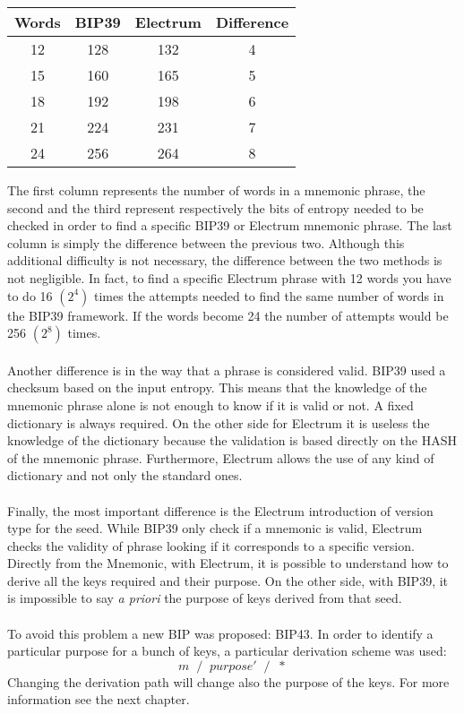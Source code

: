 \begin{center}
	\begin{tabular}{|| c | c | c | c ||} 
		\hline
		Words & BIP39 & Electrum & Difference \\ [0.5ex] 
		\hline\hline
		12 & 128 & 132 & 4 \\ 
		
		15 & 160 & 165 & 5 \\
		
		18 & 192 & 198 & 6 \\
		
		21 & 224 & 231 & 7 \\
		
		24 & 256 & 264 & 8 \\ 
		\hline
	\end{tabular}
\end{center}
The first column represents the number of words in a mnemonic phrase, the second and the third represent respectively the bits of entropy needed to be checked in order to find a specific BIP39 or Electrum mnemonic phrase. The last column is simply the difference between the previous two. Although this additional difficulty is not necessary, the difference between the two methods is not negligible. In fact, to find a specific Electrum phrase with 12 words you have to do 16 $(2^4)$ times the attempts needed to find the same number of words in the BIP39 framework. If the words become 24 the number of attempts would be 256 $(2^8)$ times.
\\ \\ 
Another difference is in the way that a phrase is considered valid. BIP39 used a checksum based on the input entropy. This means that the knowledge of the mnemonic phrase alone is not enough to know if it is valid or not. A fixed dictionary is always required. On the other side for Electrum it is useless the knowledge of the dictionary because the validation is based directly on the HASH of the mnemonic phrase. Furthermore, Electrum allows the use of any kind of dictionary and not only the standard ones.
\\ \\
Finally, the most important difference is the Electrum introduction of version type for the seed. While BIP39 only check if a mnemonic is valid, Electrum checks the validity of phrase looking if it corresponds to a specific version. Directly from the Mnemonic, with Electrum, it is possible to understand how to derive all the keys required and their purpose. On the other side, with BIP39, it is impossible to say \textit{a priori} the purpose of keys derived from that seed. 
\\ \\
To avoid this problem a new BIP was proposed: BIP43. In order to identify a particular purpose for a bunch of keys, a particular derivation scheme was used:
\begin{equation*}
m\; \;/\;\; purpose'\;\; /\;\; *
\end{equation*}
Changing the derivation path will change also the purpose of the keys. For more information see the next chapter.









